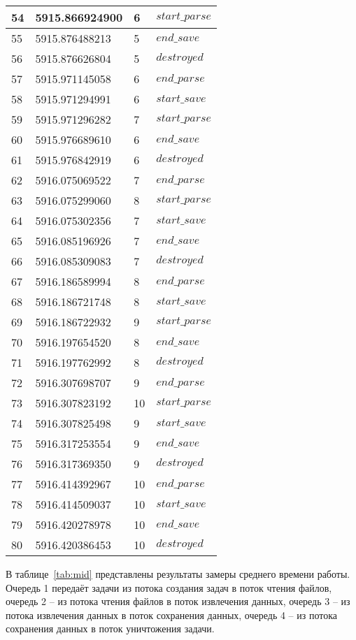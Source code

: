 \begin{longtable}{|p{}|p{}|p{}|p{}|}
	\hline
	54 & 5915.866924900 & 6 & $start\_parse$\\
	\hline
	55 & 5915.876488213 & 5 & $end\_save$\\
	\hline
	56 & 5915.876626804 & 5 & $destroyed$\\
	\hline
	57 & 5915.971145058 & 6 & $end\_parse$\\
	\hline
	58 & 5915.971294991 & 6 & $start\_save$\\
	\hline
	59 & 5915.971296282 & 7 & $start\_parse$\\
	\hline
	60 & 5915.976689610 & 6 & $end\_save$\\
	\hline
	61 & 5915.976842919 & 6 & $destroyed$\\
	\hline
	62 & 5916.075069522 & 7 & $end\_parse$\\
	\hline
	63 & 5916.075299060 & 8 & $start\_parse$\\
	\hline
	64 & 5916.075302356 & 7 & $start\_save$\\
	\hline
	65 & 5916.085196926 & 7 & $end\_save$\\
	\hline
	66 & 5916.085309083 & 7 & $destroyed$\\
	\hline
	67 & 5916.186589994 & 8 & $end\_parse$\\
	\hline
	68 & 5916.186721748 & 8 & $start\_save$\\
	\hline
	69 & 5916.186722932 & 9 & $start\_parse$\\
	\hline
	70 & 5916.197654520 & 8 & $end\_save$\\
	\hline
	71 & 5916.197762992 & 8 & $destroyed$\\
	\hline
	72 & 5916.307698707 & 9 & $end\_parse$\\
	\hline
	73 & 5916.307823192 & 10 & $start\_parse$\\
	\hline
	74 & 5916.307825498 & 9 & $start\_save$\\
	\hline
	75 & 5916.317253554 & 9 & $end\_save$\\
	\hline
	76 & 5916.317369350 & 9 & $destroyed$\\
	\hline
	77 & 5916.414392967 & 10 & $end\_parse$\\
	\hline
	78 & 5916.414509037 & 10 & $start\_save$\\
	\hline
	79 & 5916.420278978 & 10 & $end\_save$\\
	\hline
	80 & 5916.420386453 & 10 & $destroyed$\\
	\hline
\end{longtable}

В таблице~\ref{tab:mid} представлены результаты замеры среднего времени работы. Очередь 1 передаёт задачи из потока создания задач в поток чтения файлов, очередь 2 -- из потока чтения файлов в поток извлечения данных, очередь 3 -- из потока извлечения данных в поток сохранения данных, очередь 4 -- из потока сохранения данных в поток уничтожения задачи.

